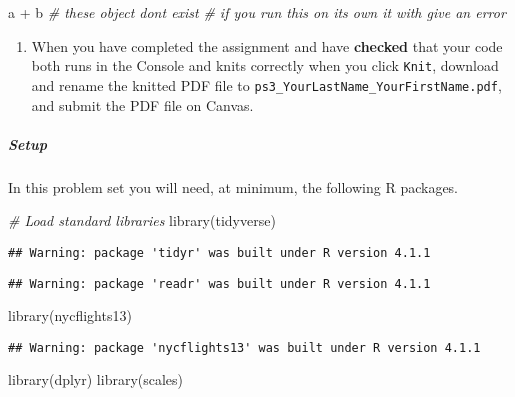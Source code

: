 \documentclass[
]{article}
\newenvironment{Shaded}{\begin{snugshade}}{\end{snugshade}}
\newcommand{\CommentTok}[1]{\textcolor[rgb]{0.56,0.35,0.01}{\textit{#1}}}
\newcommand{\FunctionTok}[1]{\textcolor[rgb]{0.00,0.00,0.00}{#1}}
\newcommand{\NormalTok}[1]{#1}
\newcommand{\SpecialCharTok}[1]{\textcolor[rgb]{0.00,0.00,0.00}{#1}}
\providecommand{\tightlist}{%
  \setlength{\itemsep}{0pt}\setlength{\parskip}{0pt}}
\begin{document}
\begin{Shaded}
\begin{Highlighting}[]
\NormalTok{a }\SpecialCharTok{+}\NormalTok{ b }\CommentTok{\# these object don\textquotesingle{}t exist }
\CommentTok{\# if you run this on its own it with give an error}
\end{Highlighting}
\end{Shaded}

\begin{enumerate}
\def\labelenumi{\arabic{enumi}.}
\setcounter{enumi}{6}
\tightlist
\item
  When you have completed the assignment and have \textbf{checked} that
  your code both runs in the Console and knits correctly when you click
  \texttt{Knit}, download and rename the knitted PDF file to
  \texttt{ps3\_YourLastName\_YourFirstName.pdf}, and submit the PDF file
  on Canvas.
\end{enumerate}

\hypertarget{setup}{%
\subparagraph{Setup}\label{setup}}

In this problem set you will need, at minimum, the following R packages.

\begin{Shaded}
\begin{Highlighting}[]
\CommentTok{\# Load standard libraries}
\FunctionTok{library}\NormalTok{(tidyverse)}
\end{Highlighting}
\end{Shaded}

\begin{verbatim}
## Warning: package 'tidyr' was built under R version 4.1.1
\end{verbatim}

\begin{verbatim}
## Warning: package 'readr' was built under R version 4.1.1
\end{verbatim}

\begin{Shaded}
\begin{Highlighting}[]
\FunctionTok{library}\NormalTok{(nycflights13)}
\end{Highlighting}
\end{Shaded}

\begin{verbatim}
## Warning: package 'nycflights13' was built under R version 4.1.1
\end{verbatim}

\begin{Shaded}
\begin{Highlighting}[]
\FunctionTok{library}\NormalTok{(dplyr)}
\FunctionTok{library}\NormalTok{(scales)}
\end{Highlighting}
\end{Shaded}
\end{document}
